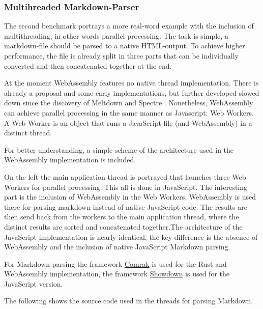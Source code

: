 \subsubsection{Multihreaded Markdown-Parser}
The second benchmark portrays a more real-word example with the inclusion of multithreading, in other words parallel processing. The task is simple, a \gls{markdown}-file should be parsed to a native HTML-output. To achieve higher performance, the file is already split in three parts that can be individually converted and then concatenated together at the end.

At the moment WebAssembly features no native thread implementation. There is already a proposal and some early implementations, but further developed slowed down since the discovery of Meltdown and Spectre \cite[cf.][]{wasm:threads}. Nonetheless, WebAssembly can achieve parallel processing in the same manner as Javascript: Web Workers. A Web Worker is an object that runs a JavaScript-file (and WebAssembly) in a distinct thread. 

For better understanding, a simple scheme of the architecture used in the WebAssembly implementation is included. 


On the left the main application thread is portrayed that launches three Web Workers for parallel processing. This all is done in JavaScript. The interesting part is the inclusion of WebAssembly in the Web Workers. WebAssembly is used there for parsing markdown instead of native JavaScript code. The results are then send back from the workers to the main application thread, where the distinct results are sorted and concatenated together.The architecture of the JavaScript implementation is nearly identical, the key difference is the absence of WebAssembly and the inclusion of native JavaScript Markdown parsing.

For Markdown-parsing the framework \href{https://github.com/kivikakk/comrak}{Comrak} is used for the Rust and WebAssembly implementation, the framework \href{https://github.com/showdownjs/showdown}{Showdown} is used for the JavaScript version.

\newpage
The following shows the source code used in the threads for parsing Markdown.

